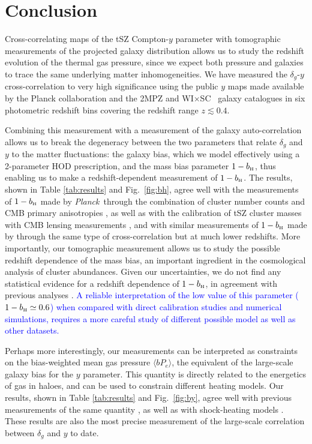 \documentclass[useAMS,usenatbib]{mn2e}
\newcommand{\wisc}{WI$\times$SC}
\newcommand{\DA}[1]{\textcolor{blue}{#1}}
\def\bH{b_{\scriptscriptstyle\rm H}}
\def\planck{{\it Planck\/}}
\begin{document}
\section{Conclusion}\label{sec:conclusion}
  Cross-correlating maps of the tSZ Compton-$y$ parameter with tomographic measurements of the projected galaxy distribution allows us to study the redshift evolution of the thermal gas pressure, since we expect both pressure and galaxies to trace the same underlying matter inhomogeneities. We have measured the $\delta_g$-$y$ cross-correlation to very high significance using the public $y$ maps made available by the Planck collaboration \citep{2016A&A...594A..22P} and the 2MPZ and \wisc~ galaxy catalogues \citep{2014ApJS..210....9B,2016ApJS..225....5B} in six photometric redshift bins covering the redshift range $z\lesssim0.4$.
  
  Combining this measurement with a measurement of the galaxy auto-correlation allows us to break the degeneracy between the two parameters that relate $\delta_g$ and $y$ to the matter fluctuations: the galaxy bias, which we model effectively using a 2-parameter HOD prescription, and the mass bias parameter $1-\bH$, thus enabling us to make a redshift-dependent measurement of $1-\bH$. The results, shown in Table \ref{tab:results} and Fig.\!~\ref{fig:bh}, agree well with the measurements of $1-\bH$ made by \planck\ through the combination of cluster number counts and CMB primary anisotropies \citep{2016A&A...594A..24P}, as well as with the calibration of tSZ cluster masses with CMB lensing measurements \citep{2019arXiv190407887Z}, and with similar measurements of $1-\bH$ made by \cite{2018MNRAS.480.3928M} through the same type of cross-correlation but at much lower redshifts. More importantly, our tomographic measurement allows us to study the possible redshift dependence of the mass bias, an important ingredient in the cosmological analysis of cluster abundances. Given our uncertainties, we do not find any statistical evidence for a redshift dependence of $1-\bH$, in agreement with previous analyses \citep{2019A&A...626A..27S}. \DA{A reliable interpretation of the low value of this parameter ($1-\bH\simeq0.6$) when compared with direct calibration studies and numerical simulations, requires a more careful study of different possible model as well as other datasets.}
  
  Perhaps more interestingly, our measurements can be interpreted as constraints on the bias-weighted mean gas pressure $\langle bP_e\rangle$, the equivalent of the large-scale galaxy bias for the $y$ parameter. This quantity is directly related to the energetics of gas in haloes, and can be used to constrain different heating models. Our results, shown in Table \ref{tab:results} and Fig.\!~\ref{fig:by}, agree well with previous measurements of the same quantity \citep{2017MNRAS.467.2315V,2019arXiv190413347P}, as well as with shock-heating models \citep{2012ApJ...758...75B}. These results are also the most precise measurement of the large-scale correlation between $\delta_g$ and $y$ to date.
\end{document}
